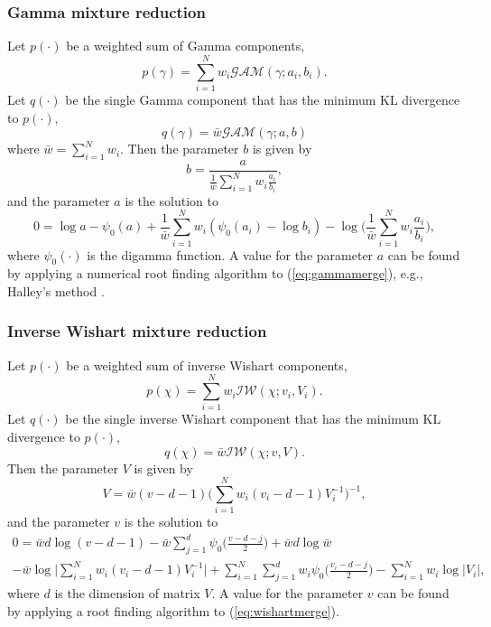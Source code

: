 \subsubsection{Gamma mixture reduction}
Let $p(\cdot)$ be a weighted sum of Gamma components,
\begin{equation}
    p(\gamma) = \sum_{i=1}^Nw_i\mathcal{GAM}(\gamma;a_i,b_i).
\end{equation}
Let $q(\cdot)$ be the single Gamma component that has the minimum KL divergence to $p(\cdot)$,
\begin{equation}
    q(\gamma) = \bar{w}\mathcal{GAM}(\gamma;a,b)
\end{equation}
where $\bar{w}=\sum_{i=1}^Nw_i$. Then the parameter $b$ is given by
\begin{equation}
    b = \frac{a}{\frac{1}{\bar{w}}\sum_{i=1}^Nw_i\frac{a_i}{b_i}},
\end{equation}
and the parameter $a$ is the solution to
\begin{equation}
    0 = \log a - \psi_0(a) +\frac{1}{\bar{w}}\sum_{i=1}^Nw_i(\psi_0(a_i)-\log b_i)-\log\bigg(\frac{1}{\bar{w}}\sum_{i=1}^Nw_i\frac{a_i}{b_i}\bigg),
    \label{eq:gammamerge}
\end{equation}
where $\psi_0(\cdot)$ is the digamma function. A value for the parameter $a$ can be found by applying a numerical root finding algorithm to (\ref{eq:gammamerge}), e.g., Halley's method \cite{halley}.


\subsubsection{Inverse Wishart mixture reduction}
Let $p(\cdot)$ be a weighted sum of inverse Wishart components, 
\begin{equation}
    p(\chi) = \sum_{i=1}^Nw_i\mathcal{IW}(\chi;v_i,V_i).
\end{equation}
Let $q(\cdot)$ be the single inverse Wishart component that has the minimum KL divergence to $p(\cdot)$,
\begin{equation}
    q(\chi) = \bar{w}\mathcal{IW}(\chi;v,V).
\end{equation}
Then the parameter $V$ is given by
\begin{equation}
    V = \bar{w}(v-d-1)\bigg(\sum_{i=1}^Nw_i(v_i-d-1)V_i^{-1}\bigg)^{-1},
\end{equation}
and the parameter $v$ is the solution to
\begin{multline}
    0 = \bar{w}d\log(v-d-1)-\bar{w}\sum_{j=1}^d\psi_0\bigg(\frac{v-d-j}{2}\bigg) + \bar{w}d\log\bar{w}\\-\bar{w}\log\bigg|\sum_{i=1}^Nw_i(v_i-d-1)V_i^{-1}\bigg|+\sum_{i=1}^N\sum_{j=1}^dw_i\psi_0\bigg(\frac{v_i-d-j}{2}\bigg)-\sum_{i=1}^Nw_i\log|V_i|,
    \label{eq:wishartmerge}
\end{multline}
where $d$ is the dimension of matrix $V$. A value for the parameter $v$ can be found by applying a root finding algorithm to (\ref{eq:wishartmerge}). 



